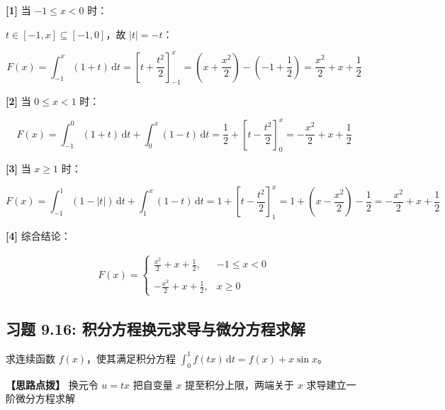 \documentclass[11pt,a4paper,UTF8]{ctexart}
\begin{document}
\begin{solbox}[分步推导与答题规范]
\textbf{[1]} 当 $-1 \leqslant x < 0$ 时：

$t \in [-1, x] \subseteq [-1, 0]$，故 $|t| = -t$：


\begin{equation*}
F(x) = \int_{-1}^x (1+t)\,\mathrm{d}t = \left[ t + \frac{t^2}{2} \right]_{-1}^x = \left(x + \frac{x^2}{2}\right) - \left(-1 + \frac{1}{2}\right) = \frac{x^2}{2} + x + \frac{1}{2}
\end{equation*}


\textbf{[2]} 当 $0 \leqslant x < 1$ 时：


\begin{equation*}
F(x) = \int_{-1}^0 (1+t)\,\mathrm{d}t + \int_0^x (1-t)\,\mathrm{d}t = \frac{1}{2} + \left[ t - \frac{t^2}{2} \right]_0^x = -\frac{x^2}{2} + x + \frac{1}{2}
\end{equation*}


\textbf{[3]} 当 $x \geqslant 1$ 时：


\begin{equation*}
F(x) = \int_{-1}^1 (1-|t|)\,\mathrm{d}t + \int_1^x (1-t)\,\mathrm{d}t = 1 + \left[ t - \frac{t^2}{2} \right]_1^x = 1 + \left(x - \frac{x^2}{2}\right) - \frac{1}{2} = -\frac{x^2}{2} + x + \frac{1}{2}
\end{equation*}


\textbf{[4]} 综合结论：


\begin{align*}
F(x) = \begin{cases} \frac{x^2}{2} + x + \frac{1}{2}, & -1 \leqslant x < 0 \\ \\ -\frac{x^2}{2} + x + \frac{1}{2}, & x \geqslant 0 \end{cases}
\end{align*}

\end{solbox}


\subsection{习题 9.16: 积分方程换元求导与微分方程求解}

求连续函数 $f(x)$，使其满足积分方程 $\int_0^1 f(tx)\,\mathrm{d}t = f(x) + x\sin x$。

\textbf{\color{DeepPurple}【思路点拨】} 换元令 $u = tx$ 把自变量 $x$ 提至积分上限，两端关于 $x$ 求导建立一阶微分方程求解
\end{document}
